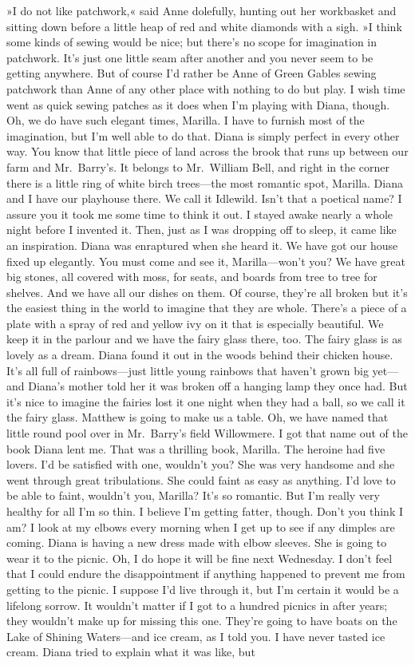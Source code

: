 »I do not like patchwork,« said Anne dolefully, hunting out her workbasket and sitting down before a little heap of red and white diamonds with a sigh. »I think some kinds of sewing would be nice; but there's no scope for imagination in patchwork. It's just one little seam after another and you never seem to be getting anywhere. But of course I'd rather be Anne of Green Gables sewing patchwork than Anne of any other place with nothing to do but play. I wish time went as quick sewing patches as it does when I'm playing with Diana, though. Oh, we do have such elegant times, Marilla. I have to furnish most of the imagination, but I'm well able to do that. Diana is simply perfect in every other way. You know that little piece of land across the brook that runs up between our farm and Mr.~Barry's. It belongs to Mr.~William Bell, and right in the corner there is a little ring of white birch trees—the most romantic spot, Marilla. Diana and I have our playhouse there. We call it Idlewild. Isn't that a poetical name? I assure you it took me some time to think it out. I stayed awake nearly a whole night before I invented it. Then, just as I was dropping off to sleep, it came like an inspiration. Diana was enraptured when she heard it. We have got our house fixed up elegantly. You must come and see it, Marilla—won't you? We have great big stones, all covered with moss, for seats, and boards from tree to tree for shelves. And we have all our dishes on them. Of course, they're all broken but it's the easiest thing in the world to imagine that they are whole. There's a piece of a plate with a spray of red and yellow ivy on it that is especially beautiful. We keep it in the parlour and we have the fairy glass there, too. The fairy glass is as lovely as a dream. Diana found it out in the woods behind their chicken house. It's all full of rainbows—just little young rainbows that haven't grown big yet—and Diana's mother told her it was broken off a hanging lamp they once had. But it's nice to imagine the fairies lost it one night when they had a ball, so we call it the fairy glass. Matthew is going to make us a table. Oh, we have named that little round pool over in Mr.~Barry's field Willowmere. I got that name out of the book Diana lent me. That was a thrilling book, Marilla. The heroine had five lovers. I'd be satisfied with one, wouldn't you? She was very handsome and she went through great tribulations. She could faint as easy as anything. I'd love to be able to faint, wouldn't you, Marilla? It's so romantic. But I'm really very healthy for all I'm so thin. I believe I'm getting fatter, though. Don't you think I am? I look at my elbows every morning when I get up to see if any dimples are coming. Diana is having a new dress made with elbow sleeves. She is going to wear it to the picnic. Oh, I do hope it will be fine next Wednesday. I don't feel that I could endure the disappointment if anything happened to prevent me from getting to the picnic. I suppose I'd live through it, but I'm certain it would be a lifelong sorrow. It wouldn't matter if I got to a hundred picnics in after years; they wouldn't make up for missing this one. They're going to have boats on the Lake of Shining Waters—and ice cream, as I told you. I have never tasted ice cream. Diana tried to explain what it was like, but 